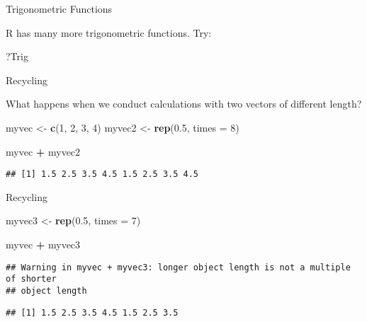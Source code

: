 \documentclass[ignorenonframetext,]{beamer}
\newenvironment{Shaded}{\begin{snugshade}}{\end{snugshade}}
\newcommand{\DataTypeTok}[1]{\textcolor[rgb]{0.13,0.29,0.53}{#1}}
\newcommand{\DecValTok}[1]{\textcolor[rgb]{0.00,0.00,0.81}{#1}}
\newcommand{\FloatTok}[1]{\textcolor[rgb]{0.00,0.00,0.81}{#1}}
\newcommand{\KeywordTok}[1]{\textcolor[rgb]{0.13,0.29,0.53}{\textbf{#1}}}
\newcommand{\NormalTok}[1]{#1}
\newcommand{\OperatorTok}[1]{\textcolor[rgb]{0.81,0.36,0.00}{\textbf{#1}}}
\newcommand{\StringTok}[1]{\textcolor[rgb]{0.31,0.60,0.02}{#1}}
\begin{document}
\begin{frame}[fragile]{Trigonometric Functions}
\protect\hypertarget{trigonometric-functions-3}{}

R has many more trigonometric functions. Try:

\begin{Shaded}
\begin{Highlighting}[]
\NormalTok{?Trig}
\end{Highlighting}
\end{Shaded}

\end{frame}

\begin{frame}[fragile]{Recycling}
\protect\hypertarget{recycling}{}

What happens when we conduct calculations with two vectors of different
length?

\begin{Shaded}
\begin{Highlighting}[]
\NormalTok{myvec <-}\StringTok{ }\KeywordTok{c}\NormalTok{(}\DecValTok{1}\NormalTok{, }\DecValTok{2}\NormalTok{, }\DecValTok{3}\NormalTok{, }\DecValTok{4}\NormalTok{) }
\NormalTok{myvec2 <-}\StringTok{ }\KeywordTok{rep}\NormalTok{(}\FloatTok{0.5}\NormalTok{, }\DataTypeTok{times =} \DecValTok{8}\NormalTok{)}

\NormalTok{myvec }\OperatorTok{+}\StringTok{ }\NormalTok{myvec2}
\end{Highlighting}
\end{Shaded}

\begin{verbatim}
## [1] 1.5 2.5 3.5 4.5 1.5 2.5 3.5 4.5
\end{verbatim}

\end{frame}

\begin{frame}[fragile]{Recycling}
\protect\hypertarget{recycling-1}{}

\begin{Shaded}
\begin{Highlighting}[]
\NormalTok{myvec3 <-}\StringTok{ }\KeywordTok{rep}\NormalTok{(}\FloatTok{0.5}\NormalTok{, }\DataTypeTok{times =} \DecValTok{7}\NormalTok{)}

\NormalTok{myvec }\OperatorTok{+}\StringTok{ }\NormalTok{myvec3}
\end{Highlighting}
\end{Shaded}

\begin{verbatim}
## Warning in myvec + myvec3: longer object length is not a multiple of shorter
## object length
\end{verbatim}

\begin{verbatim}
## [1] 1.5 2.5 3.5 4.5 1.5 2.5 3.5
\end{verbatim}

\end{frame}
\end{document}
